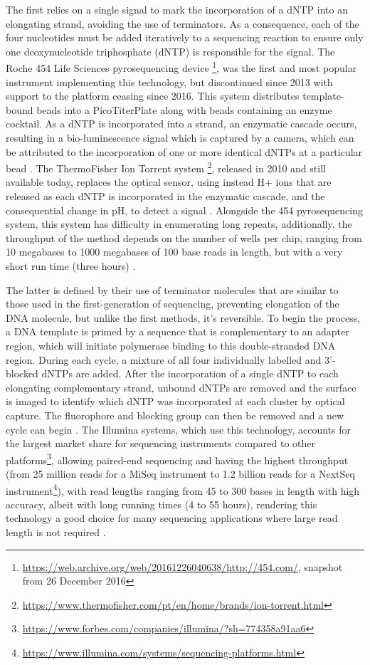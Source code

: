 The first relies on a single signal to mark the incorporation of a dNTP into an elongating strand, avoiding the use of terminators. As a consequence, each of the four nucleotides must be added iteratively to a sequencing reaction to ensure only one deoxynucleotide triphosphate (dNTP) is responsible for the signal. The Roche 454 Life Sciences pyrosequencing device \footnote{\url{https://web.archive.org/web/20161226040638/http://454.com/}, snapshot from 26 December 2016}, was the first and most popular instrument implementing this technology, but discontinued since 2013 with support to the platform ceasing since 2016. This system distributes template-bound beads into a PicoTiterPlate along with beads containing an enzyme cocktail. As a dNTP is incorporated into a strand, an enzymatic cascade occurs, resulting in a bio-luminescence signal which is captured by a camera, which can be attributed to the incorporation of one or more identical dNTPs at a particular bead \citep{goodwin_coming_2016}. The ThermoFisher Ion Torrent system \footnote{\url{https://www.thermofisher.com/pt/en/home/brands/ion-torrent.html}}, released in 2010 and still available today, replaces the optical sensor, using instead  H+ ions that are released as each dNTP is incorporated in the enzymatic cascade, and the consequential change in pH, to detect a signal \citep{goodwin_coming_2016}. Alongside the 454 pyrosequencing system, this system has difficulty in enumerating long repeats, additionally, the throughput of the method depends on the number of wells per chip, ranging from 10 megabases to 1000 megabases of 100 base reads in length, but with a very short run time (three hours) \citep{hagemann_overview_2015, loman_performance_2012}.

The latter is defined by their use of terminator molecules that are similar to those used in the first-generation of sequencing, preventing elongation of the DNA molecule, but unlike the first methods, it's reversible. To begin the process, a DNA template is primed by a sequence that is complementary to an adapter region, which will initiate polymerase binding to this double-stranded DNA region. During each cycle, a mixture of all four individually labelled and 3'-blocked dNTPs are added. After the incorporation of a single dNTP to each elongating complementary strand, unbound dNTPs are removed and the surface is imaged to identify which dNTP was incorporated at each cluster by optical capture. The fluorophore and blocking group can then be removed and a new cycle can begin \citep{goodwin_coming_2016}. The Illumina systems, which use this technology, accounts for the largest market share for sequencing instruments compared to other platforms\footnote{\url{https://www.forbes.com/companies/illumina/?sh=774358a91aa6}}, allowing paired-end sequencing and having the highest throughput (from 25 million reads for a MiSeq instrument to  1.2 billion reads for a NextSeq instrument\footnote{\url{https://www.illumina.com/systems/sequencing-platforms.html}}), with read lengths ranging from 45 to 300 bases in length with high accuracy, albeit with long running times (4 to 55 hours), rendering this technology a good choice for many sequencing applications where large read length is not required \citep{loman_performance_2012, gupta_chapter_2014, hagemann_overview_2015}.

